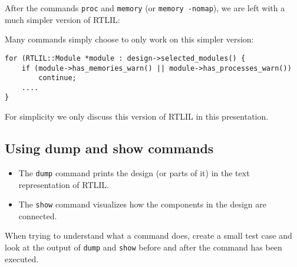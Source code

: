 \begin{frame}[fragile]{\subsecname}
After the commands {\tt proc} and {\tt memory} (or {\tt memory -nomap}), we are
left with a much simpler version of RTLIL:

\begin{center}
\end{center}

\bigskip
Many commands simply choose to only work on this simpler version:
\begin{lstlisting}[xleftmargin=0.5cm, basicstyle=\ttfamily\fontsize{8pt}{10pt}\selectfont]
for (RTLIL::Module *module : design->selected_modules() {
    if (module->has_memories_warn() || module->has_processes_warn())
        continue;
    ....
}
\end{lstlisting}

For simplicity we only discuss this version of RTLIL in this presentation.
\end{frame}


\subsection{Using dump and show commands}

\begin{frame}{\subsecname}
\begin{itemize}
\item The {\tt dump} command prints the design (or parts of it) in the text representation of RTLIL.

\bigskip
\item The {\tt show} command visualizes how the components in the design are connected.
\end{itemize}

\bigskip
When trying to understand what a command does, create a small test case and
look at the output of {\tt dump} and {\tt show} before and after the command
has been executed.
\end{frame}


